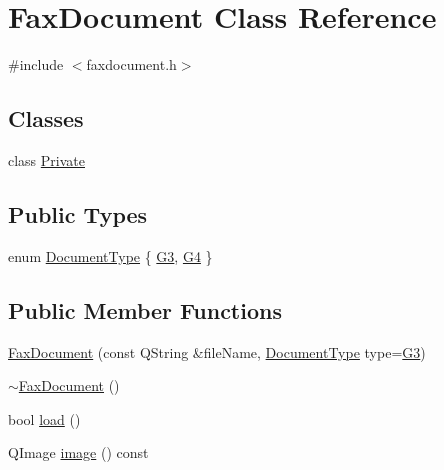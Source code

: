 \hypertarget{classFaxDocument}{\section{Fax\+Document Class Reference}
\label{classFaxDocument}
}


{\ttfamily \#include $<$faxdocument.\+h$>$}

\subsection*{Classes}
\begin{DoxyCompactItemize}
\item 
class \hyperlink{classFaxDocument_1_1Private}{Private}
\end{DoxyCompactItemize}
\subsection*{Public Types}
\begin{DoxyCompactItemize}
\item 
enum \hyperlink{classFaxDocument_a0590424a710415338643b6b9c91b30de}{Document\+Type} \{ \hyperlink{classFaxDocument_a0590424a710415338643b6b9c91b30dea2d43ce64c1412ea8a7dfa1fbfe756fd8}{G3}, 
\hyperlink{classFaxDocument_a0590424a710415338643b6b9c91b30dea8a858710690eefc015a052c756899600}{G4}
 \}
\end{DoxyCompactItemize}
\subsection*{Public Member Functions}
\begin{DoxyCompactItemize}
\item 
\hyperlink{classFaxDocument_a6d933ecf41b82aa5b81fdec56a925b4e}{Fax\+Document} (const Q\+String \&file\+Name, \hyperlink{classFaxDocument_a0590424a710415338643b6b9c91b30de}{Document\+Type} type=\hyperlink{classFaxDocument_a0590424a710415338643b6b9c91b30dea2d43ce64c1412ea8a7dfa1fbfe756fd8}{G3})
\item 
\hyperlink{classFaxDocument_ac010bfd9c40ab52ec04beb0e7b7240a3}{$\sim$\+Fax\+Document} ()
\item 
bool \hyperlink{classFaxDocument_a5f4925e7066994bb82eaa46aabc0a2a7}{load} ()
\item 
Q\+Image \hyperlink{classFaxDocument_a5136832e9e051dcb6536bebb8d35cf6d}{image} () const 
\end{DoxyCompactItemize}


